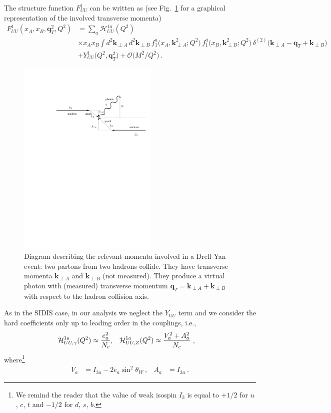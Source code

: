 \documentclass[aps,preprintnumbers,showpacs,nofootinbib,superscriptaddress,floatfix]{revtex4}
\newcommand{\T}{\perp}
\begin{document}
The structure function $F_{UU}^1$ can be written as (see Fig.~\ref{f:trans_momenta_DY} for a graphical
representation of the involved transverse momenta)
\begin{align}
\label{e:DYkT}
   F_{UU}^1(x_A,x_B, \bm{q}_{T}^2, Q^2) &= \sum_a \mathcal{H}_{UU}^{1 a}(Q^2) \\ 
      &\times x_A x_B \int d^2\bm{k}_{\T A}^{} \, d^2\bm{k}_{\T B}^{} 
\,  f_1^a\big(x_A,\bm{k}_{\T A}^2; Q^2 \big) 
\, f_{1}^{\bar{a}}\big(x_B,\bm{k}_{\T B}^2; Q^2 \big) \,
      \delta^{(2)} \big({\bm k}_{\T A} - {\bm q}_T + {\bm k}_{\T B}\big)
\nonumber\\&
\nonumber + Y_{UU}^1\big(Q^2, \bm{q}_T^2\big) + \mathcal{O}\big(M^2/Q^2\big) \, .
\end{align} 

\begin{figure}
\centering
\includegraphics[width=0.6\textwidth]{plots/trans_momenta_DY}
\caption{Diagram describing the relevant momenta involved in a Drell-Yan
  event: two partons from two hadrons collide. They have transverse momenta
  $\bm{k}_{\T A}$ and  $\bm{k}_{\T B}$ (not measured). They produce a virtual
  photon with (measured) transverse momentum $\bm{q}_T=\bm{k}_{\T A}+\bm{k}_{\T B} $ with respect to the hadron
  collision axis.}
\label{f:trans_momenta_DY}
\end{figure}

As in the SIDIS case, in our analysis we neglect the $Y_{UU}$ term
and we consider the hard coefficients only up to leading order in
the couplings, i.e.,
\begin{align} 
{\cal H}_{UU, \gamma}^{1 a}(Q^2) &\approx \frac{e_a^2}{N_c},
&
{\cal H}_{UU, Z}^{1 a}(Q^2) &\approx \frac{V_a^2+A_a^2}{N_c} \ ,
\end{align}  
where\footnote{We remind the reader that the value of weak isospin $I_3$ is equal to $+1/2$ for $u$, $c$, $t$ and
  $-1/2$ for $d$, $s$, $b$.}
\begin{align}
V_a & = I_{3a} - 2 e_{a} \sin^2 \theta_W \  ,
&
A_a & = I_{3a} \  .
\end{align} 
\end{document}
